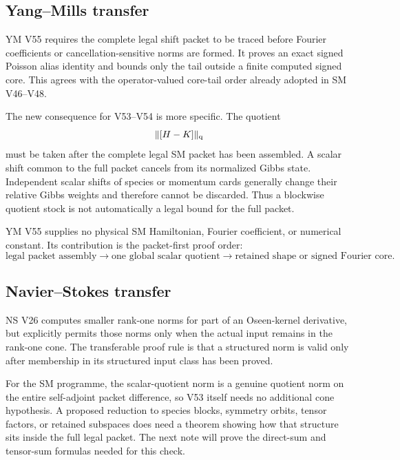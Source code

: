 \documentclass[11pt]{article}
\theoremstyle{remark}
\begin{document}
\subsection{Yang--Mills transfer}

YM V55 requires the complete legal shift packet to be traced before
Fourier coefficients or cancellation-sensitive norms are formed.
It proves an exact signed Poisson alias identity and bounds only the
tail outside a finite computed signed core.  This agrees with the
operator-valued core-tail order already adopted in SM V46--V48.

The new consequence for V53--V54 is more specific.  The quotient
\[
                         \|[H-K]\|_{\rm q}
\]
must be taken after the complete legal SM packet has been assembled.
A scalar shift common to the full packet cancels from its normalized
Gibbs state.  Independent scalar shifts of species or momentum cards
generally change their relative Gibbs weights and therefore cannot
be discarded.  Thus a blockwise quotient stock is not automatically
a legal bound for the full packet.

YM V55 supplies no physical SM Hamiltonian, Fourier coefficient, or
numerical constant.  Its contribution is the packet-first proof
order:
\begin{equation}
 \boxed{
 \text{legal packet assembly}
 \longrightarrow
 \text{one global scalar quotient}
 \longrightarrow
 \text{retained shape or signed Fourier core}.}   \tag{55.3}
\end{equation}

\subsection{Navier--Stokes transfer}

NS V26 computes smaller rank-one norms for part of an Oseen-kernel
derivative, but explicitly permits those norms only when the actual
input remains in the rank-one cone.  The transferable proof rule is
that a structured norm is valid only after membership in its
structured input class has been proved.

For the SM programme, the scalar-quotient norm is a genuine quotient
norm on the entire self-adjoint packet difference, so V53 itself
needs no additional cone hypothesis.  A proposed reduction to
species blocks, symmetry orbits, tensor factors, or retained
subspaces does need a theorem showing how that structure sits inside
the full legal packet.  The next note will prove the direct-sum and
tensor-sum formulas needed for this check.
\end{document}
